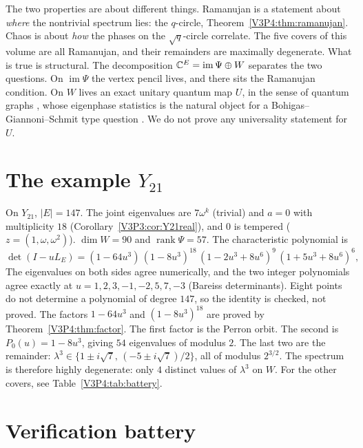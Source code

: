 \begin{remark}\label{V3P4:rem:unify}
The two properties are about different things. Ramanujan is a statement about \emph{where} the
nontrivial spectrum lies: the $q$-circle, Theorem~\ref{V3P4:thm:ramanujan}. Chaos is about
\emph{how} the phases on the $\sqrt q$-circle correlate. The five covers of this volume are all
Ramanujan, and their remainders are maximally degenerate. What is true is structural. The
decomposition $\mathbb{C}^{E}=\operatorname{im}\Psi\oplus W$ separates the two questions. On
$\operatorname{im}\Psi$ the vertex pencil lives, and there sits the Ramanujan condition. On $W$
lives an exact unitary quantum map $U$, in the sense of quantum graphs \cite{KS97}, whose
eigenphase statistics is the natural object for a Bohigas--Giannoni--Schmit type question
\cite{BGS84,JMRR99}. We do not prove any universality statement for $U$.
\end{remark}

\section{The example \texorpdfstring{$Y_{21}$}{Y21}}\label{V3P4:sec:example}

On $Y_{21}$, $|E|=147$. The joint eigenvalues are $7\omega^{k}$ (trivial) and $a=0$ with
multiplicity $18$ (Corollary~\ref{V3P3:cor:Y21real}), and $0$ is tempered ($z=(1,\omega,\omega^{2})$).
$\dim W=90$ and $\operatorname{rank}\Psi=57$. The characteristic polynomial is
\[
\det(I-uL_E)=(1-64u^{3})\,(1-8u^{3})^{18}\,(1-2u^{3}+8u^{6})^{9}\,(1+5u^{3}+8u^{6})^{6},
\]
The eigenvalues on both sides agree numerically, and the two integer polynomials agree exactly
at $u=1,2,3,-1,-2,5,7,-3$ (Bareiss determinants). Eight points do not determine a polynomial of
degree $147$, so the identity is checked, not proved. The factors $1-64u^{3}$ and
$(1-8u^{3})^{18}$ are proved by Theorem~\ref{V3P4:thm:factor}. The first
factor is the Perron orbit. The second is $P_0(u)=1-8u^{3}$, giving $54$ eigenvalues of modulus
$2$. The last two are the remainder: $\lambda^{3}\in\{1\pm i\sqrt7,\,(-5\pm i\sqrt7)/2\}$, all
of modulus $2^{3/2}$. The spectrum is therefore highly degenerate: only $4$ distinct values of
$\lambda^{3}$ on $W$. For the other covers, see Table~\ref{V3P4:tab:battery}.



\section{Verification battery}\label{V3P4:sec:battery}

